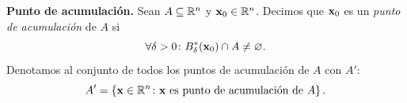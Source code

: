 \begin{definition} \textbf{Punto de acumulación.} \label{def:pto_acum}
    Sean $A \subseteq \mathbb{R}^n$ y $\vect{x}_0 \in \Rn{n}$. Decimos que $\vect{x}_0$ es un \emph{punto de acumulación} de $A$ si
    \[
     \forall \delta > 0 \colon B^*_{\delta}(\vect{x}_0) \cap A \neq \varnothing. 
    \]
    Denotamos al conjunto de todos los puntos de acumulación de $A$ con $A'$:
    \[
     A' = \left\lbrace \vect{x} \in \Rn{n} \colon \vect{x} \text{ es punto de acumulación de } A \right\rbrace.
    \]
\end{definition}












 